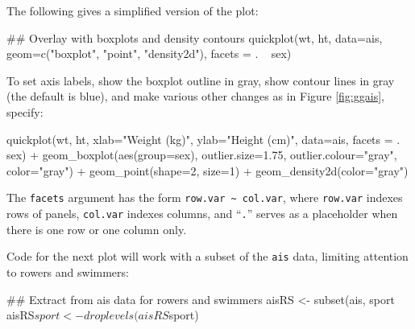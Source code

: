 \documentclass{tufte-book}\usepackage[]{graphicx}\usepackage[]{color}
\newcommand{\txtt}[1]{\texttt{#1}}
\begin{document}
The following gives a simplified version of the plot:\vspace*{-3pt}
\begin{Schunk}
\begin{Sinput}
## Overlay with boxplots and density contours
quickplot(wt, ht, data=ais,
          geom=c("boxplot", "point", "density2d"),
          facets = . ~ sex)
\end{Sinput}
\end{Schunk}
To set axis labels, show the boxplot outline in gray, show contour
lines in gray (the default is blue), and make various other changes
as in Figure \ref{fig:ggais}, specify:\vspace*{-3pt}
\begin{Schunk}
\begin{Sinput}
quickplot(wt, ht, xlab="Weight (kg)",
          ylab="Height (cm)", data=ais,
          facets = . ~ sex) +
  geom_boxplot(aes(group=sex),
               outlier.size=1.75,
               outlier.colour="gray",
               color="gray") +
  geom_point(shape=2, size=1) +
  geom_density2d(color="gray")
\end{Sinput}
\end{Schunk}

The \txtt{facets} argument has the form \verb!row.var ~ col.var!,
where \txtt{row.var} indexes rows of panels, \txtt{col.var}
indexes columns, and ``\txtt{.}'' serves as a placeholder when there is
one row or one column only.

Code for the next plot will work with a subset of the \txtt{ais}
data, limiting attention to rowers and swimmers:
\begin{Schunk}
\begin{Sinput}
## Extract from ais data for rowers and swimmers
aisRS <- subset(ais, sport %
aisRS$sport <- droplevels(aisRS$sport)
\end{Sinput}
\end{Schunk}
\end{document}
